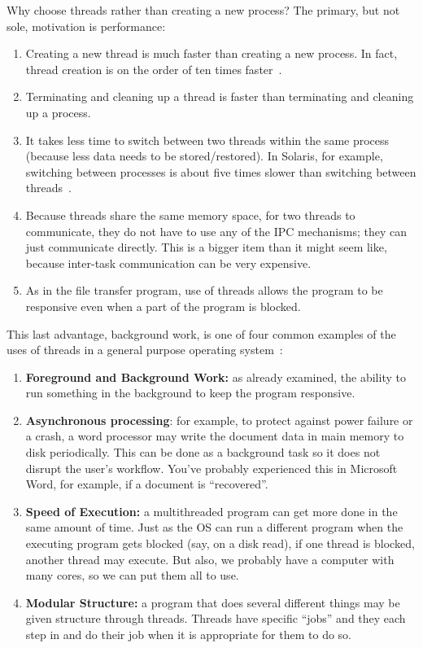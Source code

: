 Why choose threads rather than creating a new process? The primary, but not sole, motivation is performance:
\begin{enumerate}
	\item Creating a new thread is much faster than creating a new process. In fact, thread creation is on the order of ten times faster~\cite{machThreads}.
	\item Terminating and cleaning up a thread is faster than terminating and cleaning up a process.
	\item It takes less time to switch between two threads within the same process (because less data needs to be stored/restored). In Solaris, for example, switching between processes is about five times slower than switching between threads~\cite{osc}.
	\item Because threads share the same memory space, for two threads to communicate, they do not have to use any of the IPC mechanisms; they can just communicate directly. This is a bigger item than it might seem like, because inter-task communication can be very expensive.
	\item As in the file transfer program, use of threads allows the program to be responsive even when a part of the program is blocked.
\end{enumerate}

This last advantage, background work, is one of four common examples of the uses of threads in a general purpose operating system~\cite{insideOS2}:
\begin{enumerate}
	\item \textbf{Foreground and Background Work:} as already examined, the ability to run something in the background to keep the program responsive.
	\item \textbf{Asynchronous processing}: for example, to protect against power failure or a crash, a word processor may write the document data in main memory to disk periodically. This can be done as a background task so it does not disrupt the user's workflow. You've probably experienced this in Microsoft Word, for example, if a document is ``recovered''. 
	\item \textbf{Speed of Execution:} a multithreaded program can get more done in the same amount of time. Just as the OS can run a different program when the executing program gets blocked (say, on a disk read), if one thread is blocked, another thread may execute. But also, we probably have a computer with many cores, so we can put them all to use.
	\item \textbf{Modular Structure:} a program that does several different things may be given structure through threads. Threads have specific ``jobs'' and they each step in and do their job when it is appropriate for them to do so.
\end{enumerate}


